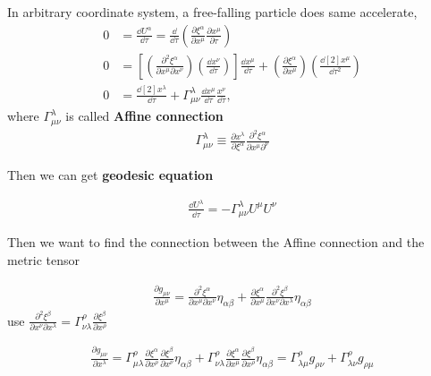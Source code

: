 In arbitrary coordinate system, a free-falling particle does same accelerate,
\begin{align}
    0&=\frac{\dd{U^{\alpha}}}{\dd{\tau}}=\frac{\dd}{\dd\tau}\left(\frac{\partial \xi^{\alpha}}{\partial x^{\mu}}\frac{\partial x^{\mu}}{\partial \tau}\right)\\
    0&=\left[\left(\frac{\partial ^{2}\xi^{\alpha}}{\partial x^{\mu}\partial x^{\nu}}\right)\left(\frac{\dd x^{\nu}}{\dd \tau}\right)\right]\frac{\dd x^{\mu}}{\dd\tau}+\left(\frac{\partial \xi^{\alpha}}{\partial x^{\mu}}\right)\left(\frac{\dd[2]{x^{\mu}}}{\dd\tau^{2}}\right)\\
    0&=\frac{\dd[2]{x^{\lambda}}}{\dd\tau}+\Gamma^{\lambda}_{\mu\nu}\frac{\dd{x^{\mu}}}{\dd\tau}\frac{x^{\nu}}{\dd\tau},
\end{align}
where $\Gamma^{\lambda}_{\mu\nu}$ is called \textbf{Affine connection}
\begin{align}
    \Gamma^{\lambda}_{\mu\nu}\equiv \frac{\partial x^{\lambda}}{\partial \xi^{\alpha}}\frac{\partial^{2}\xi^{\alpha}}{\partial x^{\mu}\partial ^{\nu}}
\end{align}

Then we can get \textbf{geodesic equation}

\begin{align}
    \frac{\dd U^{\lambda}}{\dd\tau}=-\Gamma^{\lambda}_{\mu\nu} U^{\mu}U^{\nu}
\end{align}

Then we want to find the connection between the Affine connection and the metric tensor

\begin{align}
    \frac{\partial g_{\mu\nu}}{\partial x^{\mu}}=\frac{\partial ^{2}\xi^{\alpha}}{\partial x^{\mu}\partial x^{\nu}}\eta_{\alpha\beta}+\frac{\partial \xi^{\alpha}}{\partial x^{\mu}}\frac{\partial^{2}\xi^{\beta}}{\partial x^{\nu}\partial x^{\lambda}}\eta_{\alpha \beta}
\end{align}
use $\frac{\partial^{2} \xi ^{\beta}}{\partial x^{\nu}\partial x^{\lambda}}=\Gamma^{\rho}_{\nu\lambda}\frac{\partial \xi^{\beta}}{\partial x^{\rho}}$
 
\begin{align}
    \frac{\partial g_{\mu\nu}}{\partial x^{\lambda}}=\Gamma^{\rho}_{\mu\lambda}\frac{\partial \xi^{\alpha}}{\partial x^{\rho}}\frac{\partial \xi^{\beta}}{\partial x^{\nu}}\eta_{\alpha\beta}+\Gamma^{\rho}_{\nu\lambda}\frac{\partial \xi^{\alpha}}{\partial x^{\mu}}\frac{\partial \xi^{\beta}}{\partial x^{\rho}}\eta_{\alpha \beta}=\Gamma^{\rho}_{\lambda\mu}g_{\rho\nu}+\Gamma^{\rho}_{\lambda\nu}g_{\rho\mu}
\end{align}

